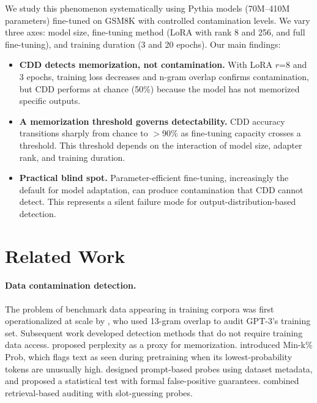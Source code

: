\documentclass[11pt]{article}
\begin{document}
We study this phenomenon systematically using Pythia models \citep{biderman2023pythia} (70M--410M parameters) fine-tuned on GSM8K \citep{cobbe2021training} with controlled contamination levels. We vary three axes: model size, fine-tuning method (LoRA \citep{hu2022lora} with rank 8 and 256, and full fine-tuning), and training duration (3 and 20 epochs). Our main findings:

\begin{itemize}
    \item \textbf{CDD detects memorization, not contamination.} With LoRA $r$=8 and 3 epochs, training loss decreases and n-gram overlap confirms contamination, but CDD performs at chance (50\%) because the model has not memorized specific outputs.
    \item \textbf{A memorization threshold governs detectability.} CDD accuracy transitions sharply from chance to $>$90\% as fine-tuning capacity crosses a threshold. This threshold depends on the interaction of model size, adapter rank, and training duration.
    \item \textbf{Practical blind spot.} Parameter-efficient fine-tuning, increasingly the default for model adaptation, can produce contamination that CDD cannot detect. This represents a silent failure mode for output-distribution-based detection.
\end{itemize}

\section{Related Work}

\paragraph{Data contamination detection.} The problem of benchmark data appearing in training corpora was first operationalized at scale by \citet{brown2020language}, who used 13-gram overlap to audit GPT-3's training set. Subsequent work developed detection methods that do not require training data access. \citet{li2023estimating} proposed perplexity as a proxy for memorization. \citet{shi2024detecting} introduced Min-k\% Prob, which flags text as seen during pretraining when its lowest-probability tokens are unusually high. \citet{golchin2024time} designed prompt-based probes using dataset metadata, and \citet{oren2024proving} proposed a statistical test with formal false-positive guarantees. \citet{deng2024investigating} combined retrieval-based auditing with slot-guessing probes.
\end{document}
